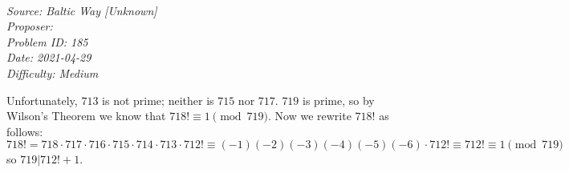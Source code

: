 \SSbreak\\
\emph{Source: Baltic Way [Unknown]}\\
\emph{Proposer: \Ptroll}\\ %
\emph{Problem ID: 185}\\
\emph{Date: 2021-04-29}\\
\emph{Difficulty: Medium}\\
\SSbreak
 
\bigskip

\begin{solution}\hfil\medskip
	
    Unfortunately, $713$ is not prime; neither is $715$ nor $717$. $719$ is prime, so by Wilson's Theorem we know that $718! \equiv 1 \pmod{719}$. Now we 
    rewrite $718!$ as follows: $$718! = 718 \cdot 717 \cdot 716 \cdot 715 \cdot 714 \cdot 713 \cdot 712! \equiv (-1)(-2)(-3)(-4)(-5)(-6) \cdot 712! \equiv 712! \equiv 1 \pmod{719}$$
    so $\boxed{719} | 712! + 1.$
\end{solution}\bigskip
